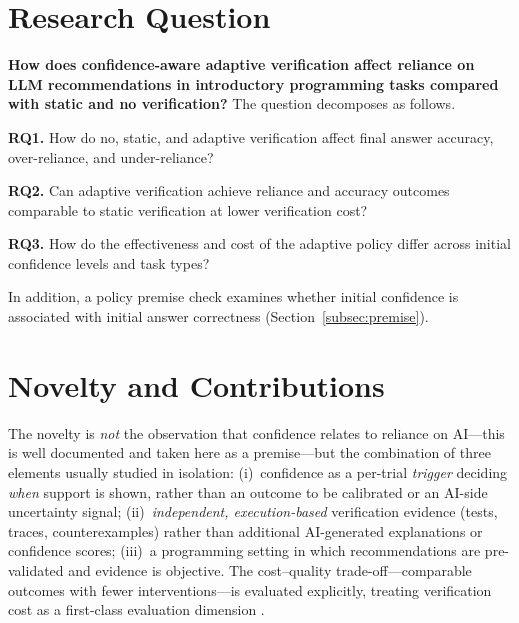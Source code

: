 \documentclass[oneside,final,14pt,a4paper]{extreport}
\begin{document}
\section{Research Question}

\textbf{How does confidence-aware adaptive verification affect reliance on LLM
recommendations in introductory programming tasks compared with static and no
verification?} The question decomposes as follows.

\textbf{RQ1.} How do no, static, and adaptive verification affect final answer
accuracy, over-reliance, and under-reliance?

\textbf{RQ2.} Can adaptive verification achieve reliance and accuracy outcomes
comparable to static verification at lower verification cost?

\textbf{RQ3.} How do the effectiveness and cost of the adaptive policy differ
across initial confidence levels and task types?

In addition, a policy premise check examines whether initial confidence is
associated with initial answer correctness (Section~\ref{subsec:premise}).

\section{Novelty and Contributions}

The novelty is \emph{not} the observation that confidence relates to reliance
on AI---this is well documented \cite{ToRelyOrNotToRely2024} and taken here as
a premise---but the combination of three elements usually studied in
isolation: (i)~confidence as a per-trial \emph{trigger} deciding \emph{when}
support is shown, rather than an outcome to be calibrated or an AI-side
uncertainty signal; (ii)~\emph{independent, execution-based} verification
evidence (tests, traces, counterexamples) rather than additional AI-generated
explanations or confidence scores; (iii)~a programming setting in which
recommendations are pre-validated and evidence is objective. The
cost--quality trade-off---comparable outcomes with fewer interventions---is
evaluated explicitly, treating verification cost as a first-class evaluation
dimension \cite{ToRelyOrNotToRely2024,VerificationCost2026}.
\end{document}
